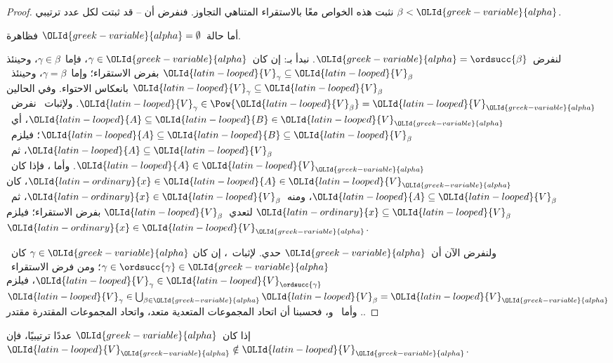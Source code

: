 \documentclass[../../../include/open-logic-section]{subfiles}
\begin{document}
\begin{proof}
نثبت هذه الخواص معًا بالاستقراء المتناهي التجاوز. فنفرض أن
-- قد ثبتت لكل عدد ترتيبي
$\beta < {\OLId{greek-variable}{alpha}}$.

أما حالة~${\OLId{greek-variable}{alpha}} = \emptyset$ فظاهرة.

لنفرض~${\OLId{greek-variable}{alpha}} = \ordsucc{\beta}$. نبدأ بـ:
إن كان~$\gamma \in {\OLId{greek-variable}{alpha}}$، فإما~$\gamma \in \beta$، وحينئذ
${\OLId{latin-looped}{V}}_\gamma \subseteq {\OLId{latin-looped}{V}}_\beta$ بفرض الاستقراء؛ وإما~$\gamma = \beta$،
وحينئذ~${\OLId{latin-looped}{V}}_\gamma \subseteq {\OLId{latin-looped}{V}}_\beta$ بانعكاس الاحتواء. وفي الحالين
${\OLId{latin-looped}{V}}_\gamma \in \Pow{{\OLId{latin-looped}{V}}_\beta} = {\OLId{latin-looped}{V}}_{\OLId{greek-variable}{alpha}}$. ولإثبات~
نفرض~${\OLId{latin-looped}{A}} \subseteq {\OLId{latin-looped}{B}} \in {\OLId{latin-looped}{V}}_{\OLId{greek-variable}{alpha}}$، أي~${\OLId{latin-looped}{A}} \subseteq {\OLId{latin-looped}{B}} \subseteq {\OLId{latin-looped}{V}}_\beta$؛
فيلزم~${\OLId{latin-looped}{A}} \subseteq {\OLId{latin-looped}{V}}_\beta$، ثم~${\OLId{latin-looped}{A}} \in {\OLId{latin-looped}{V}}_{\OLId{greek-variable}{alpha}}$. وأما
، فإذا كان~${\OLId{latin-ordinary}{x}} \in {\OLId{latin-looped}{A}} \in {\OLId{latin-looped}{V}}_{\OLId{greek-variable}{alpha}}$، كان
${\OLId{latin-looped}{A}} \subseteq {\OLId{latin-looped}{V}}_\beta$، ومنه~${\OLId{latin-ordinary}{x}} \in {\OLId{latin-looped}{V}}_\beta$، ثم~${\OLId{latin-ordinary}{x}} \subseteq {\OLId{latin-looped}{V}}_\beta$
لتعدي~${\OLId{latin-looped}{V}}_\beta$ بفرض الاستقراء؛ فيلزم~${\OLId{latin-ordinary}{x}} \in {\OLId{latin-looped}{V}}_{\OLId{greek-variable}{alpha}}$.

ولنفرض الآن أن~${\OLId{greek-variable}{alpha}}$ حدي. لإثبات~، إن كان
$\gamma \in {\OLId{greek-variable}{alpha}}$ كان~$\gamma \in \ordsucc{\gamma} \in {\OLId{greek-variable}{alpha}}$؛
ومن فرض الاستقراء~${\OLId{latin-looped}{V}}_\gamma \in {\OLId{latin-looped}{V}}_{\ordsucc{\gamma}}$، فيلزم
${\OLId{latin-looped}{V}}_\gamma \in \bigcup_{\beta \in {\OLId{greek-variable}{alpha}}} {\OLId{latin-looped}{V}}_\beta = {\OLId{latin-looped}{V}}_{\OLId{greek-variable}{alpha}}$.
وأما~ و، فحسبنا أن اتحاد
المجموعات المتعدية متعد، واتحاد المجموعات المقتدرة مقتدر.
\end{proof}

\begin{lem}
إذا كان~${\OLId{greek-variable}{alpha}}$ عددًا ترتيبيًا، فإن~${\OLId{latin-looped}{V}}_{\OLId{greek-variable}{alpha}} \notin {\OLId{latin-looped}{V}}_{\OLId{greek-variable}{alpha}}$.
\end{lem}
\end{document}
